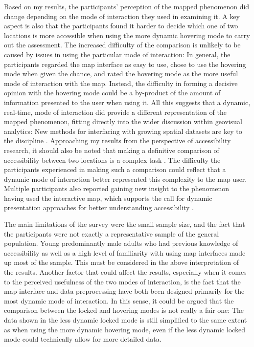 Based on my results, the participants' perception of the mapped phenomenon did change
depending on the mode of interaction they used in examining it.
A key aspect is also that the participants found it harder to decide which one
of two locations is more accessible
when using the more dynamic hovering mode to carry out the assessment.
The increased difficulty of the
comparison is unlikely to be caused by
issues in using the particular mode of interaction:
In general, the participants regarded the map interface as easy to use,
chose to use the hovering mode when given the chance,
and rated the hovering mode as the more useful mode
of interaction with the map.
Instead, the difficulty in forming a decisive opinion with the hovering mode
could be a by-product of the amount of information presented to the user when using it.
All this suggests that a dynamic, real-time, mode of interaction did provide
a different representation of the mapped phenomenon,
fitting directly into the wider discussion within geovisual analytics:
New methods for interfacing with growing spatial datasets are key to the discipline
\parencite{rob2017b, and2010}.
Approaching my results from the perspective of accessibility research,
it should also be noted that making a definitive comparison of accessibility between
two locations is a complex task \parencite{geu2004, lev2020, hu2019}.
The difficulty the participants experienced in making such a comparison
could reflect that a dynamic mode of interaction
better represented this complexity to the map user.
Multiple participants also reported gaining new insight to the phenomenon
having used the interactive map,
which supports the call for dynamic presentation approaches
for better understanding accessibility \parencite{but2018, te2014}.

The main limitations of the survey were the small sample size,
and the fact that the participants were not exactly a representative sample
of the general population.
Young predominantly male adults who had previous knowledge of accessibility
as well as a high level of familiarity with using map interfaces made up most of the sample.
This must be considered in the above interpretation of the results.
Another factor that could affect the results,
especially when it comes to the perceived usefulness of the two modes of interaction,
is the fact that the map interface and data preprocessing have both been
designed primarily for the most dynamic mode of interaction.
In this sense, it could be argued that the comparison between the locked
and hovering modes is not really a fair one:
The data shown in the less dynamic locked mode is still
simplified to the same extent as when using the more dynamic hovering mode,
even if the less dynamic locked mode could technically allow for
more detailed data.


